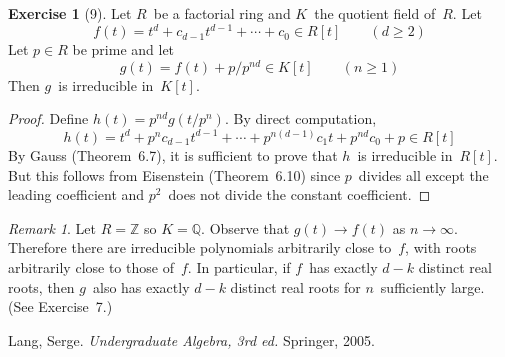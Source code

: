 \documentclass[letterpaper,12pt]{article}
\newcommand{\Z}{\mathbb{Z}}
\newcommand{\Q}{\mathbb{Q}}
\theoremstyle{definition}
\newtheorem*{exer}{Exercise}
\theoremstyle{remark}
\newtheorem*{rmk}{Remark}
\theoremstyle{direction}
\begin{document}
\begin{exer}[9]
Let \(R\)~be a factorial ring and \(K\)~the quotient field of~\(R\). Let
\[f(t)=t^d+c_{d-1}t^{d-1}+\cdots+c_0\in R[t]\qquad(d\ge2)\]
Let \(p\in R\) be prime and let
\[g(t)=f(t)+p/p^{nd}\in K[t]\qquad(n\ge1)\]
Then \(g\)~is irreducible in~\(K[t]\).
\end{exer}
\begin{proof}
Define \(h(t)=p^{nd}g(t/p^n)\). By direct computation,
\[h(t)=t^d+p^nc_{d-1}t^{d-1}+\cdots+p^{n(d-1)}c_1t+p^{nd}c_0+p\in R[t]\]
By Gauss (Theorem~6.7), it is sufficient to prove that \(h\)~is irreducible in~\(R[t]\). But this follows from Eisenstein (Theorem~6.10) since \(p\)~divides all except the leading coefficient and \(p^2\)~does not divide the constant coefficient.
\end{proof}
\begin{rmk}
Let \(R=\Z\) so \(K=\Q\). Observe that \(g(t)\to f(t)\) as \(n\to\infty\). Therefore there are irreducible polynomials arbitrarily close to~\(f\), with roots arbitrarily close to those of~\(f\). In particular, if \(f\)~has exactly \(d-k\) distinct real roots, then \(g\)~also has exactly \(d-k\) distinct real roots for \(n\)~sufficiently large. (See Exercise~7.)
\end{rmk}

\begin{thebibliography}{0}
 Lang, Serge. \textit{Undergraduate Algebra, 3rd ed.} Springer, 2005.
\end{thebibliography}
\end{document}
